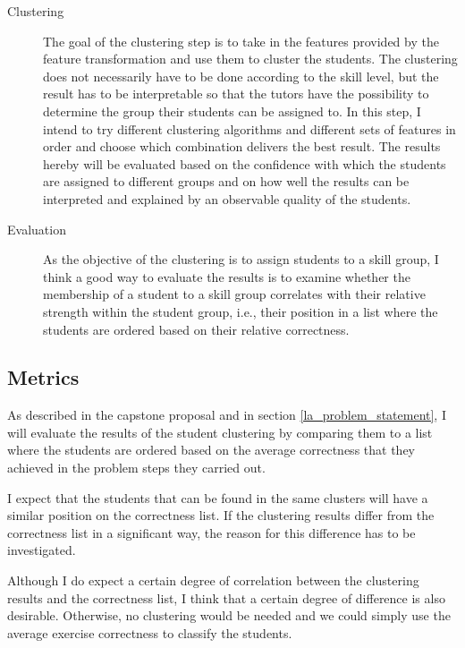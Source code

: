\begin{description}
	\item[Clustering] The goal of the clustering step is to take in the features provided by the feature transformation and use them to cluster the students. The clustering does not necessarily have to be done according to the skill level, but the result has to be interpretable so that the tutors have the possibility to determine the group their students can be assigned to. In this step, I intend to try different clustering algorithms and different sets of features in order and choose which combination delivers the best result. The results hereby will be evaluated based on the confidence with which the students are assigned to different groups and on how well the results can be interpreted and explained by an observable quality of the students.
	
	\item[Evaluation] As the objective of the clustering is to assign students to a skill group, I think a good way to evaluate the results is to examine whether the membership of a student to a skill group correlates with their relative strength within the student group, i.e., their position in a list where the students are ordered based on their relative correctness. 
\end{description}

\subsection{Metrics}

As described in the capstone proposal and in section \ref{la_problem_statement}, I will evaluate the results of the student clustering by comparing them to a list where the students are ordered based on the average correctness that they achieved in the problem steps they carried out. 

I expect that the students that can be found in the same clusters will have a similar position on the correctness list. If the clustering results differ from the correctness list in a significant way, the reason for this difference has to be investigated.

 Although I do expect a certain degree of correlation between the clustering results and the correctness list, I think that a certain degree of difference is also desirable. Otherwise, no clustering would be needed and we could simply use the average exercise correctness to classify the students.